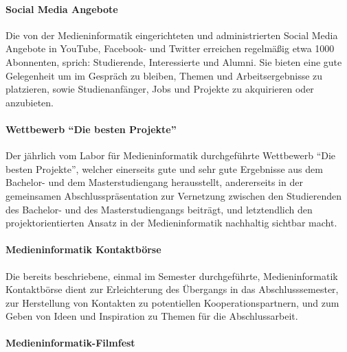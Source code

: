 \paragraph{Social Media
Angebote\label{/mi-2017/selbstbericht/0100-ist-zustand/0100-ist-zustand}}\label{social-media-angebotepathlabelmi-2017selbstbericht0100-ist-zustand0100-ist-zustand}

Die von der Medieninformatik eingerichteten und administrierten Social
Media Angebote in YouTube, Facebook- und Twitter erreichen regelmäßig
etwa 1000 Abonnenten, sprich: Studierende, Interessierte und Alumni. Sie
bieten eine gute Gelegenheit um im Gespräch zu bleiben, Themen und
Arbeitsergebnisse zu platzieren, sowie Studienanfänger, Jobs und
Projekte zu akquirieren oder anzubieten.

\paragraph{\texorpdfstring{Wettbewerb ``Die besten
Projekte''\label{/mi-2017/selbstbericht/0100-ist-zustand/0100-ist-zustand}}{Wettbewerb Die besten Projekte\label{/mi-2017/selbstbericht/0100-ist-zustand/0100-ist-zustand}}}\label{wettbewerb-die-besten-projektepathlabelmi-2017selbstbericht0100-ist-zustand0100-ist-zustand}

Der jährlich vom Labor für Medieninformatik durchgeführte Wettbewerb
``Die besten Projekte'', welcher einerseits gute und sehr gute
Ergebnisse aus dem Bachelor- und dem Masterstudiengang herausstellt,
andererseits in der gemeinsamen Abschlusspräsentation zur Vernetzung
zwischen den Studierenden des Bachelor- und des Masterstudiengangs
beiträgt, und letztendlich den projektorientierten Ansatz in der
Medieninformatik nachhaltig sichtbar macht.

\paragraph{Medieninformatik
Kontaktbörse\label{/mi-2017/selbstbericht/0100-ist-zustand/0100-ist-zustand}}\label{medieninformatik-kontaktbuxf6rsepathlabelmi-2017selbstbericht0100-ist-zustand0100-ist-zustand}

Die bereits beschriebene, einmal im Semester durchgeführte,
Medieninformatik Kontaktbörse dient zur Erleichterung des Übergangs in
das Abschlusssemester, zur Herstellung von Kontakten zu potentiellen
Kooperationspartnern, und zum Geben von Ideen und Inspiration zu Themen
für die Abschlussarbeit.

\paragraph{Medieninformatik-Filmfest\label{/mi-2017/selbstbericht/0100-ist-zustand/0100-ist-zustand}}\label{medieninformatik-filmfestpathlabelmi-2017selbstbericht0100-ist-zustand0100-ist-zustand}

